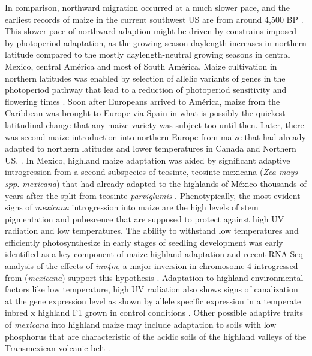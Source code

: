 \documentclass[9pt,twocolumn,twoside]{BioRxiv}
\begin{document}
In comparison, northward migration occurred at a much slower pace, and the earliest records of maize in the current southwest US are from around 4,500 BP \citep{Da_Fonseca2015-zh, Swarts2017-ge}. 
This slower pace of northward adaption might be driven by constrains imposed by photoperiod adaptation, as the growing season daylength increases in northern latitude compared to the mostly daylength-neutral growing seasons in central Mexico, central América and most of South América.  
Maize cultivation in northern latitudes was enabled by selection of allelic variants of genes in the photoperiod pathway that lead to a reduction of photoperiod sensitivity and flowering times \citep{Liang2018-af, Guo2018-on, Coles2010-db, Huang2018-ga, Yang2013-lg, Salvi2007-ku, Wang2017-bc, Hung2012-ms}.
Soon after Europeans arrived to América, maize from the Caribbean was brought to Europe via Spain \citep{Brandolini1968-eu, Brandenburg2017-ii} in what is possibly the quickest latitudinal change that any maize variety was subject too until then. 
Later, there was second maize introduction into northern Europe from maize that had already adapted to northern latitudes and lower temperatures in Canada and Northern US. \citep{Brandenburg2017-ii}. 
In Mexico, highland maize adaptation was aided by significant adaptive introgression from a second subspecies of teosinte, teosinte mexicana (\textit{Zea mays spp. mexicana}) that had already adapted to the highlands of México thousands of years after the split from teosinte \textit{parviglumis} \citep{Hufford2013-gs, Gonzalez-Segovia2019-jy}. 
Phenotypically, the most evident signs of \textit{mexicana} introgression into maize are the high levels of stem pigmentation and pubescence \citep{Lauter2004-eq} that are supposed to protect against high UV radiation and low temperatures. 
The ability to withstand low temperatures and efficiently photosynthesize in early stages of seedling development was early identified as a key component of maize highland adaptation \citep{Hardacre1980-tq} and recent RNA-Seq analysis of the effects of \textit{inv4m}, a major inversion in chromosome 4 introgressed from (\textit{mexicana}) support this hypothesis \cite{Crow2020-gene}. 
Adaptation to highland environmental factors like low temperature, high UV radiation also shows signs of canalization at the gene expression level as shown by allele specific expression in a temperate inbred x highland F1 grown in control conditions \cite{Aguilar-Rangel2017-rm}.
Other possible adaptive traits of \textit{mexicana} into highland maize may include adaptation to soils with low phosphorus \citep{AguirreLiguori2019-fl, Fustier2017-sl} that are characteristic of the acidic soils of the highland valleys of the Transmexican volcanic belt \citep{Krasilnikov2013-sm}.
\end{document}
